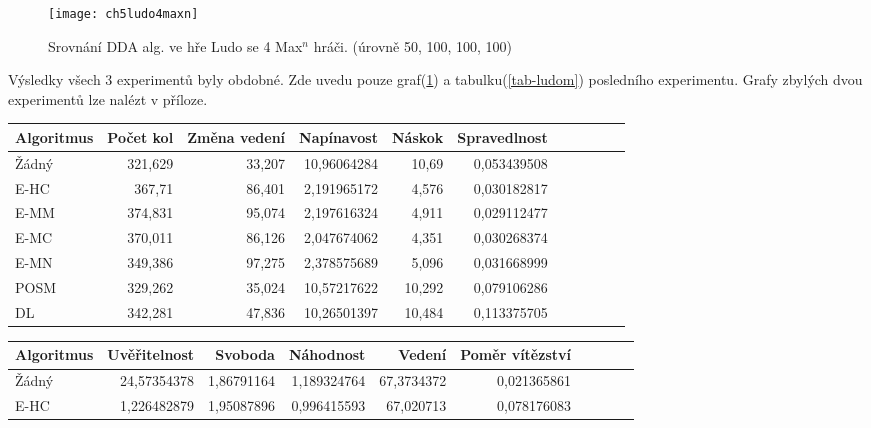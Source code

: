 \begin{figure}
  \centering
  \texttt{[image: ch5ludo4maxn]}
	\caption{Srovnání DDA alg. ve hře Ludo se 4 Max$^n$ hráči. (úrovně 50, 100, 100, 100)}
	\label{fig-ch5ludo4maxn}
\end{figure}

Výsledky všech 3 experimentů byly obdobné. Zde uvedu pouze graf(\ref{fig-ch5ludo4maxn}) a tabulku(\ref{tab-ludom}) posledního experimentu. Grafy zbylých dvou experimentů lze nalézt v příloze.

\begin{table*}[b]\footnotesize
\vspace*{0mm}
\caption{{\label{tab-ludom}} Porovnání metrik zábavnosti u jednotlivých algoritmů ve hře Ludo. Metriky změna vedení a svoboda se maximalizují, zbytek minimalizuje.}
\vspace*{0mm}
\label{shadowtable}
\begin{center}
\begin{tabular}{| l || r | r | r | r | r | r | r | r | r | r |}
\hline
Algoritmus & Počet kol	& Změna vedení & Napínavost & Náskok & Spravedlnost\\
\hline
\hline
Žádný & 321,629 & 33,207 & 10,96064284 & 10,69 & 0,053439508 \\ \hline  
E-HC & 367,71 & 86,401 & 2,191965172 & 4,576 & 0,030182817 \\ \hline  
E-MM & 374,831 & 95,074 & 2,197616324 & 4,911 & 0,029112477 \\ \hline  
E-MC & 370,011 & 86,126 & 2,047674062 & 4,351 & 0,030268374 \\ \hline  
E-MN & 349,386 & 97,275 & 2,378575689 & 5,096 & 0,031668999 \\ \hline  
POSM & 329,262 & 35,024 & 10,57217622 & 10,292 & 0,079106286 \\ \hline  
DL & 342,281 & 47,836 & 10,26501397 & 10,484 & 0,113375705 \\ \hline  
\end{tabular}
\end{center}
\begin{center}
\begin{tabular}{| l || r | r | r | r | r | r | r | r | r |}
\hline
Algoritmus & Uvěřitelnost & Svoboda & Náhodnost & Vedení &	Poměr vítězství \\
\hline
\hline
Žádný & 24,57354378 & 1,86791164 & 1,189324764 & 67,3734372 & 0,021365861 \\ \hline  
E-HC & 1,226482879 & 1,95087896 & 0,996415593 & 67,020713 & 0,078176083 \\ \hline  

\end{tabular}
\end{center}
\end{table*}
